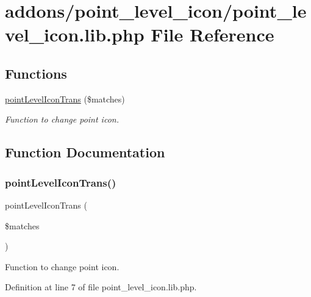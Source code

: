 \hypertarget{point__level__icon_8lib_8php}{}\section{addons/point\+\_\+level\+\_\+icon/point\+\_\+level\+\_\+icon.lib.\+php File Reference}
\label{point__level__icon_8lib_8php}
\subsection*{Functions}
\begin{DoxyCompactItemize}
\item 
\hyperlink{point__level__icon_8lib_8php_a6581bcaf11de4c31924e7a5de3d6887d}{point\+Level\+Icon\+Trans} (\$matches)
\begin{DoxyCompactList}\small\item\em Function to change point icon. \end{DoxyCompactList}\end{DoxyCompactItemize}


\subsection{Function Documentation}
\hypertarget{point__level__icon_8lib_8php_a6581bcaf11de4c31924e7a5de3d6887d}{}\label{point__level__icon_8lib_8php_a6581bcaf11de4c31924e7a5de3d6887d} 
\subsubsection{\texorpdfstring{point\+Level\+Icon\+Trans()}{pointLevelIconTrans()}}
{\footnotesize\ttfamily point\+Level\+Icon\+Trans (\begin{DoxyParamCaption}\item[{}]{\$matches }\end{DoxyParamCaption})}



Function to change point icon. 



Definition at line 7 of file point\+\_\+level\+\_\+icon.\+lib.\+php.

